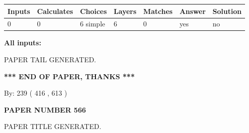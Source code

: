 \documentclass{ctexart}
\begin{document}
 
   
   
   
   
\noindent\begin{tabular}{|l|l|l|l|l|l|l|}
 \hline
Inputs & Calculates & Choices & Layers & Matches & Answer & Solution \\ \hline
 0  & 
 0  & 
 6
  simple  
  & 
 6  & 
 0  & 
  yes & 
  no 
  \\ \hline
 \end{tabular}
   
   
   
   
\noindent{}
   
   
   
   
\noindent\vspace{0.1in}\hspace{-0.08in} {\textbf{\Large{All inputs: }}}
   
   
   
   
   
   
 \vspace{0.2in}
 
   
   
\vspace{2.0in} PAPER TAIL GENERATED.
   
   
   
   
\vspace{1.0in} 
{\textbf{\large{ *** END OF PAPER, THANKS *** }}} 
   
   
\hspace{1.0in} By: 
 239 ( 416 ,  613 )
   
   
   
   
\newpage 
\setcounter{page}{ 
   566001 } 
   
   
   
   
 {\textbf{ \Large{ PAPER NUMBER  566  }}}
   
   
\vspace{0.2in}
   
   
   
   
   
   
   
   
 \vspace{0.2in}
 
 
 
 
   
   
 PAPER TITLE GENERATED.
   
\end{document}
